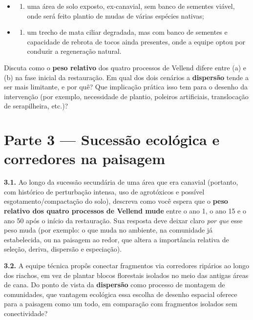 \documentclass[
  brazilian,
  letterpaper,
  DIV=11,
  numbers=noendperiod]{scrartcl}
\providecommand{\tightlist}{%
  \setlength{\itemsep}{0pt}\setlength{\parskip}{0pt}}
\begin{document}
\begin{itemize}
\tightlist
\item
  \begin{enumerate}
  \def\labelenumi{(\alph{enumi})}
  \tightlist
  \item
    uma área de solo exposto, ex-canavial, sem banco de sementes viável,
    onde será feito plantio de mudas de várias espécies nativas;
  \end{enumerate}
\item
  \begin{enumerate}
  \def\labelenumi{(\alph{enumi})}
  \setcounter{enumi}{1}
  \tightlist
  \item
    um trecho de mata ciliar degradada, mas com banco de sementes e
    capacidade de rebrota de tocos ainda presentes, onde a equipe optou
    por conduzir a regeneração natural.
  \end{enumerate}
\end{itemize}

Discuta como o \textbf{peso relativo} dos quatro processos de Vellend
difere entre (a) e (b) na fase inicial da restauração. Em qual dos dois
cenários a \textbf{dispersão} tende a ser mais limitante, e por quê? Que
implicação prática isso tem para o desenho da intervenção (por exemplo,
necessidade de plantio, poleiros artificiais, translocação de
serapilheira, etc.)?

\section{Parte 3 --- Sucessão ecológica e corredores na
paisagem}\label{parte-3-sucessuxe3o-ecoluxf3gica-e-corredores-na-paisagem}

\textbf{3.1.} Ao longo da sucessão secundária de uma área que era
canavial (portanto, com histórico de perturbação intensa, uso de
agrotóxicos e possível esgotamento/compactação do solo), descreva como
você espera que o \textbf{peso relativo dos quatro processos de Vellend
mude} entre o ano 1, o ano 15 e o ano 50 após o início da restauração.
Sua resposta deve deixar claro \emph{por que} esse peso muda (por
exemplo: o que muda no ambiente, na comunidade já estabelecida, ou na
paisagem ao redor, que altera a importância relativa de seleção, deriva,
dispersão e especiação).

\textbf{3.2.} A equipe técnica propôs conectar fragmentos via corredores
ripários ao longo dos riachos, em vez de plantar blocos florestais
isolados no meio das antigas áreas de cana. Do ponto de vista da
\textbf{dispersão} como processo de montagem de comunidades, que
vantagem ecológica essa escolha de desenho espacial oferece para a
paisagem como um todo, em comparação com fragmentos isolados sem
conectividade?
\end{document}
